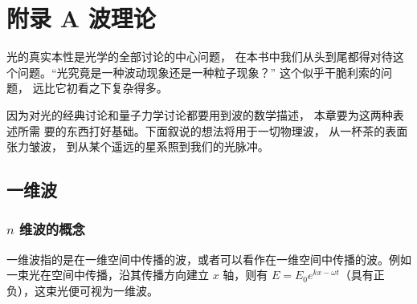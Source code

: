 \documentclass[UTF8]{report}
\theoremstyle{MyLineTheoremStyle} %
\theoremstyle{MyBlockTheoremStyle} %
\theoremstyle{MySubsubsectionStyle} %
\begin{document}


\newpage
\appendix
\titleformat{\chapter}[hang]{\normalfont\huge\bfseries\centering}{}{20pt}{}
\titlespacing*{\chapter}{0pt}{-25pt}{8pt} %
\titleformat{\section}[hang]{\normalfont\centering\Large\bfseries}{\thesection}{8pt}{}

\chapter*{附录 A\hspace*{20pt} 波理论}   
\thispagestyle{fancy} 
\setcounter{section}{0}   
\renewcommand\thesection{A.\arabic{section}}   
\renewcommand{\thefigure}{A.\arabic{figure}} 
\renewcommand{\thetable}{A.\arabic{table}}


光的真实本性是光学的全部讨论的中心问题， 在本书中我们从头到尾都得对待这个问题。“光究竟是一种波动现象还是一种粒子现象？” 这个似乎干脆利索的问题， 远比它初看之下复杂得多。

因为对光的经典讨论和量子力学讨论都要用到波的数学描述， 本章要为这两种表述所需
要的东西打好基础。下面叙说的想法将用于一切物理波， 从一杯茶的表面张力皱波， 到从某个遥远的星系照到我们的光脉冲。

\section{一维波}

\subsection{$n$ 维波的概念}

一维波指的是在一维空间中传播的波，或者可以看作在一维空间中传播的波。例如一束光在空间中传播，沿其传播方向建立 $x$ 轴，则有 $E = E_0 e^{kx - \omega t}$（具有正负），这束光便可视为一维波。
\end{document}
